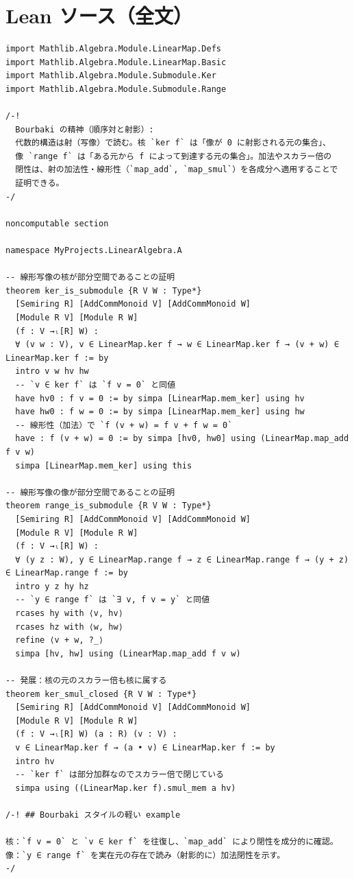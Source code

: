 \documentclass[12pt]{article}
\begin{document}
\section*{Lean ソース（全文）}
\begin{lstlisting}
import Mathlib.Algebra.Module.LinearMap.Defs
import Mathlib.Algebra.Module.LinearMap.Basic
import Mathlib.Algebra.Module.Submodule.Ker
import Mathlib.Algebra.Module.Submodule.Range

/-!
  Bourbaki の精神（順序対と射影）:
  代数的構造は射（写像）で読む。核 `ker f` は「像が 0 に射影される元の集合」、
  像 `range f` は「ある元から f によって到達する元の集合」。加法やスカラー倍の
  閉性は、射の加法性・線形性（`map_add`, `map_smul`）を各成分へ適用することで
  証明できる。
-/

noncomputable section

namespace MyProjects.LinearAlgebra.A

-- 線形写像の核が部分空間であることの証明
theorem ker_is_submodule {R V W : Type*}
  [Semiring R] [AddCommMonoid V] [AddCommMonoid W] 
  [Module R V] [Module R W]
  (f : V →ₗ[R] W) :
  ∀ (v w : V), v ∈ LinearMap.ker f → w ∈ LinearMap.ker f → (v + w) ∈ LinearMap.ker f := by
  intro v w hv hw
  -- `v ∈ ker f` は `f v = 0` と同値
  have hv0 : f v = 0 := by simpa [LinearMap.mem_ker] using hv
  have hw0 : f w = 0 := by simpa [LinearMap.mem_ker] using hw
  -- 線形性（加法）で `f (v + w) = f v + f w = 0`
  have : f (v + w) = 0 := by simpa [hv0, hw0] using (LinearMap.map_add f v w)
  simpa [LinearMap.mem_ker] using this

-- 線形写像の像が部分空間であることの証明  
theorem range_is_submodule {R V W : Type*}
  [Semiring R] [AddCommMonoid V] [AddCommMonoid W]
  [Module R V] [Module R W]
  (f : V →ₗ[R] W) :
  ∀ (y z : W), y ∈ LinearMap.range f → z ∈ LinearMap.range f → (y + z) ∈ LinearMap.range f := by
  intro y z hy hz
  -- `y ∈ range f` は `∃ v, f v = y` と同値
  rcases hy with ⟨v, hv⟩
  rcases hz with ⟨w, hw⟩
  refine ⟨v + w, ?_⟩
  simpa [hv, hw] using (LinearMap.map_add f v w)

-- 発展：核の元のスカラー倍も核に属する
theorem ker_smul_closed {R V W : Type*}
  [Semiring R] [AddCommMonoid V] [AddCommMonoid W]
  [Module R V] [Module R W]
  (f : V →ₗ[R] W) (a : R) (v : V) :
  v ∈ LinearMap.ker f → (a • v) ∈ LinearMap.ker f := by
  intro hv
  -- `ker f` は部分加群なのでスカラー倍で閉じている
  simpa using ((LinearMap.ker f).smul_mem a hv)

/-! ## Bourbaki スタイルの軽い example

核：`f v = 0` と `v ∈ ker f` を往復し、`map_add` により閉性を成分的に確認。
像：`y ∈ range f` を実在元の存在で読み（射影的に）加法閉性を示す。
-/


\end{lstlisting}
\end{document}
